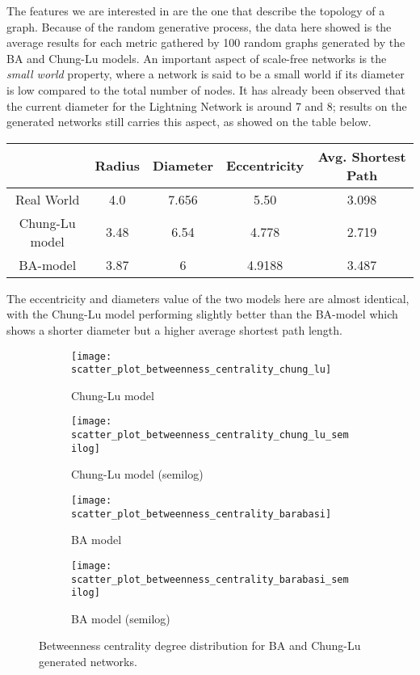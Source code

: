 	The features we are interested in are the one that describe the topology of a graph. Because of the random generative process, the data here showed is the average results for each metric gathered by 100 random graphs generated by the BA and Chung-Lu models. An important aspect of scale-free networks is the \textit{small world} property, where a network is said to be a small world if its diameter is low compared to the total number of nodes. It has already been observed that the current diameter for the Lightning Network is around 7 and 8; results on the generated networks still carries this aspect, as showed on the table below.
	
	\begin{center}
		\begin{tabulary}{\linewidth}{| C | C | C | C | C |}
			\hline
			& Radius & Diameter & Eccentricity & Avg. Shortest Path \\ \hline
			Real World & 4.0 & 7.656 & 5.50 & 3.098 \\ \hline
			Chung-Lu model & 3.48 & 6.54 &  4.778 &  2.719 \\ \hline
			BA-model & 3.87 & 6 & 4.9188 & 3.487 \\ 
			\hline
		\end{tabulary}
	\end{center}
	The eccentricity and diameters value of the two models here are almost identical, with the Chung-Lu model performing slightly better than the BA-model which shows a shorter diameter but a higher average shortest path length.
	
		\begin{figure}[htbp]
		\centering
		\begin{subfigure}{0.49\textwidth}
			\centering
			\texttt{[image: scatter\_plot\_betweenness\_centrality\_chung\_lu]}
			\caption{Chung-Lu model}
		\end{subfigure}
		\begin{subfigure}{0.49\textwidth}
			\centering
			\texttt{[image: scatter\_plot\_betweenness\_centrality\_chung\_lu\_semilog]}
			\caption{Chung-Lu model (semilog)}
		\end{subfigure}
		
		\begin{subfigure}{0.49\textwidth}
			\centering
			\texttt{[image: scatter\_plot\_betweenness\_centrality\_barabasi]}
			\caption{BA model}
		\end{subfigure}
		\begin{subfigure}{0.49\textwidth}
			\centering
			\texttt{[image: scatter\_plot\_betweenness\_centrality\_barabasi\_semilog]}
			\caption{BA model (semilog)}
		\end{subfigure}
		\caption{Betweenness centrality degree distribution for BA and Chung-Lu generated networks.}
		\label{betweenness_centrality_degree_models}
	\end{figure}
	
